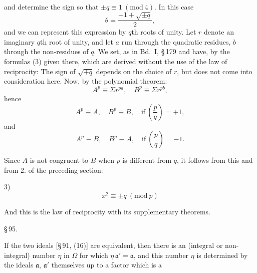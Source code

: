 
and determine the sign so that $\pm q \equiv 1 \ (\mathrm{mod}\ 4)$.
In this case
\[
\theta = \frac{-1 + \sqrt{\pm q}}{2},
\]
and we can represent this expression by $q$th roots of unity.
Let $r$ denote an imaginary $q$th root of unity, and let
$a$ run through the quadratic residues, $b$ through the non-residues of $q$.
We set, as in Bd.\ I, \S\,179
and have, by the formulas (3) given there, which are derived without the use
of the law of reciprocity:
The sign of $\sqrt{+q}$ depends on the choice of $r$,
but does not come into consideration here. Now, by the polynomial
 theorem:
\[
A^p \equiv \Sigma r^{pa}, \quad B^p \equiv \Sigma r^{pb},
\]
hence
\[
A^p \equiv A, \quad B^p \equiv B, \quad \text{if} \ \left(\frac{p}{q}\right) = +1,
\]
and
\[
A^p \equiv B, \quad B^p \equiv A, \quad \text{if} \ \left(\frac{p}{q}\right) = -1.
\]

Since $A$ is not congruent to $B$ when $p$ is different from $q$,
it follows from this and from 2. of the preceding section:

3) 
\[
x^2 \equiv \pm q \ (\mathrm{mod}\ p)
\]

And this is the law of reciprocity with its supplementary theorems.

\S\,95. 

If the two ideals [\S\,91, (16)]
are equivalent, then there is an (integral or non-integral) number $\eta$
in $\Omega$ for which $\eta\, \mathfrak{a}' = \mathfrak{a}$, and this number $\eta$ is determined by the ideals
$\mathfrak{a}$, $\mathfrak{a}'$ themselves up to a factor which is a 
